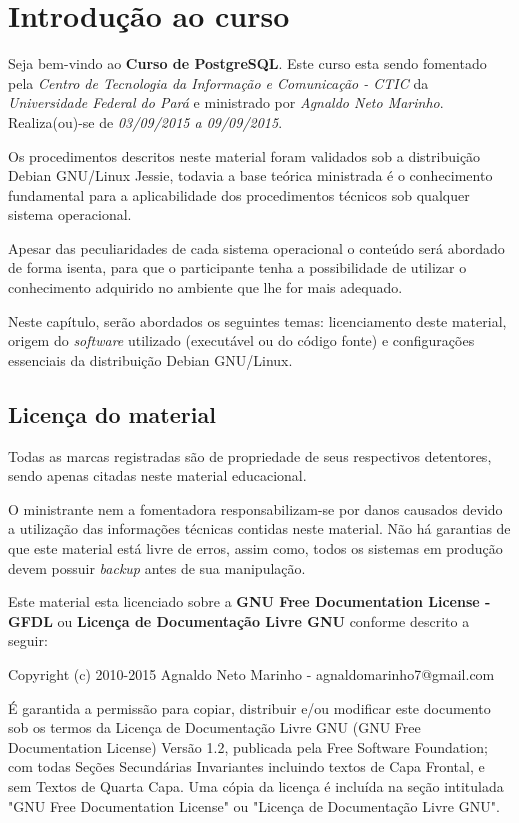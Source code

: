 \newpage \chapter{Introdução ao curso}\setcounter{SteP}{1}

    Seja bem-vindo ao {\bf Curso de PostgreSQL}. Este curso esta sendo
fomentado pela {\it Centro de Tecnologia da Informação e Comunicação - CTIC}
da {\it Universidade Federal do Pará} e ministrado por {\it Agnaldo Neto
Marinho}. Realiza(ou)-se de {\it 03/09/2015 a 09/09/2015}.

    Os procedimentos descritos neste material foram validados sob a
distribuição Debian GNU/Linux Jessie, todavia a base teórica ministrada é o
conhecimento fundamental para a aplicabilidade dos procedimentos técnicos sob
qualquer sistema operacional.

    Apesar das peculiaridades de cada sistema operacional o conteúdo será
abordado de forma isenta, para que o participante tenha a possibilidade de
utilizar o conhecimento adquirido no ambiente que lhe for mais adequado.

    Neste capítulo, serão abordados os seguintes temas: licenciamento deste
material, origem do {\it software} utilizado (executável ou do código fonte)
e configurações essenciais da distribuição Debian GNU/Linux.

\section{Licença do material}\setcounter{SteP}{1}

    Todas as marcas registradas são de propriedade de seus respectivos
detentores, sendo apenas citadas neste material educacional.

    O ministrante nem a fomentadora responsabilizam-se por danos causados
devido a utilização das informações técnicas contidas neste material. Não há
garantias de que este material está livre de erros, assim como, todos os
sistemas em produção devem possuir {\it backup} antes de sua manipulação.

    Este material esta licenciado sobre a {\bf GNU Free Documentation
License - GFDL} ou {\bf Licença de Documentação Livre GNU} conforme descrito a
seguir:

\begin{BoxVerbatim}
    Copyright (c) 2010-2015 Agnaldo Neto Marinho - agnaldomarinho7@gmail.com

    É garantida a permissão para copiar, distribuir e/ou modificar este documento
sob os termos da Licença de Documentação Livre GNU (GNU Free Documentation
License) Versão 1.2, publicada pela Free Software Foundation; com todas Seções
Secundárias Invariantes incluindo textos de Capa Frontal, e sem Textos de Quarta
Capa. Uma cópia da licença é incluída na seção intitulada "GNU Free Documentation
License" ou "Licença de Documentação Livre GNU".
\end{BoxVerbatim}

